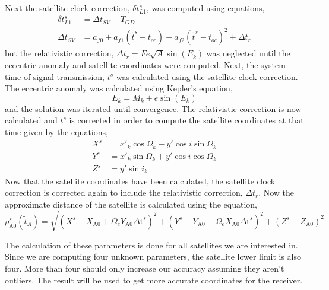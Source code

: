 Next the satellite clock correction, $\delta t_{L1}^s$, was computed using equations,
\begin{align*}
	\delta t_{L1}^s &= \Delta t_{SV}-T_{GD} \\
	\Delta t_{SV} &= a_{f0} + a_{f1}(\tilde{t}^s - t_{oc}) + a_{f2}(\tilde{t}^s - t_{oc})^2 + \Delta t_r
\end{align*}
but the relativistic correction, $\Delta t_r = Fe\sqrt{A} \sin(E_k)$ was neglected until the eccentric anomaly and satellite coordinates were computed.  Next, the system time of signal transmission, $t^s$ was calculated using the satellite clock correction. The eccentric anomaly was calculated using Kepler's equation,
\begin{equation*}
	E_k = M_k + e \sin(E_k)
\end{equation*}
 and the solution was iterated until convergence.  The relativistic correction is now calculated and $t^s$ is corrected in order to compute the satellite coordinates at that time given by the equations,
 \begin{align}
 	X^s &=x'_k \cos \Omega_k -y' \cos i \sin \Omega_k \nonumber \\
	Y^s &=x'_k \sin \Omega_k +y' \cos i \cos \Omega_k \nonumber \\
	Z^s &= y' \sin i_k  \nonumber
 \end{align}
 Now that the satellite coordinates have been calculated, the satellite clock correction is corrected again to include the relativistic correction, $\Delta t_r$.  Now the approximate distance of the satellite is calculated using the equation,
 \begin{equation*}
\rho _{\text{A0}}^s\left(\tilde{t}_A\right) = 
\sqrt{\left(
X^s-X_{\text{A0}}+\dot{\Omega}_eY_{\text{A0}}  \text{$\Delta $t}^s
\right)^2+\left(
Y^s-Y_{\text{A0}}-\dot{\Omega}_eX_{\text{A0}} \text{$\Delta $t}^s
\right)^2+\left(
Z^s-Z_{\text{A0}}
\right)^2}
 \end{equation*}
 
 The calculation of these parameters is done for all satellites we are interested in.  Since we are computing four unknown parameters, the satellite lower limit is also four.  More than four should only increase our accuracy assuming they aren't outliers. The result will be used to get more accurate coordinates for the receiver.  
